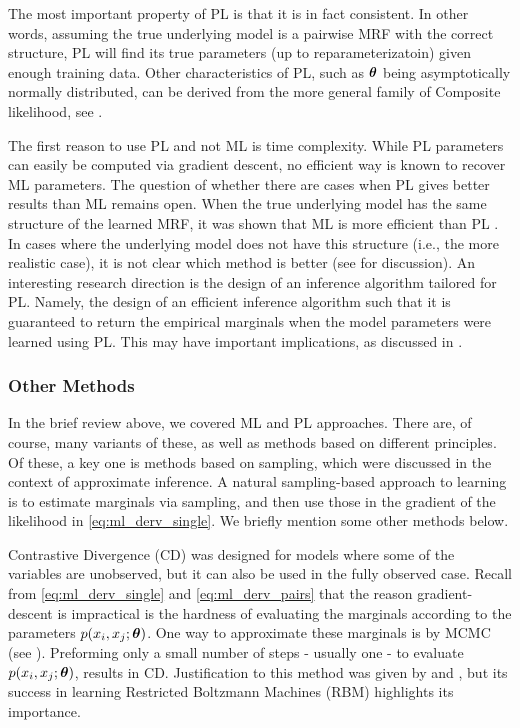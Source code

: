 The most important property of PL is that it is in fact consistent. In other words, assuming the true underlying model is a pairwise MRF with the correct structure, PL will find its true parameters (up to reparameterizatoin) given enough training data. Other characteristics of PL, such as $\boldsymbol{\theta}$ being asymptotically normally distributed, can be derived from the more general family of Composite likelihood, see \cite{varin2011overview}.

The first reason to use PL and not ML is time complexity.
While PL parameters can easily be computed via gradient descent, no efficient way is known to recover ML parameters.
The question of whether there are cases when PL gives better results than ML remains open.
When the true underlying model has the same structure of the learned MRF, it was shown that ML is more efficient than PL \cite{liang2008asymptotic}.
In cases where the underlying model does not have this structure (i.e., the more realistic case), it is not clear which method is better (see \cite{varin2011overview} for discussion).
An interesting research direction is the design of an inference algorithm tailored for PL.
Namely, the design of an efficient inference algorithm such that it is guaranteed to return the empirical marginals when the model parameters were learned using PL.
This may have important implications, as discussed in .

\subsubsection{Other Methods}
In the brief review above, we covered ML and PL approaches.
There are, of course, many variants of these, as well as methods based on different principles. Of these, a key one is methods based on sampling, which were discussed in the context of approximate inference. A natural sampling-based approach to learning is to estimate marginals via sampling, and then use those in the gradient of the likelihood in \eqref{eq:ml_derv_single}. We briefly mention some other methods below.
 
Contrastive Divergence (CD) \cite{hinton2002training} was designed for models where some of the variables are unobserved, but it can also be used in the fully observed case. Recall from \eqref{eq:ml_derv_single} and \eqref{eq:ml_derv_pairs} that the reason gradient-descent is impractical is the hardness of evaluating the marginals according to the parameters $p(x_i,x_j;\boldsymbol{\theta})$. 
One way to approximate these marginals is by MCMC (see ).
Preforming only a small number of steps - usually one - to evaluate $p(x_i,x_j;\boldsymbol{\theta})$, results in CD. Justification to this method was given by \cite{bengio2009justifying} and \cite{carreira2005contrastive}, but its success in learning Restricted Boltzmann Machines (RBM) highlights its importance.

